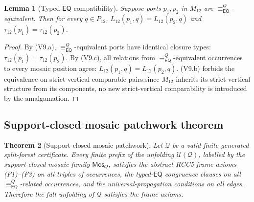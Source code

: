 \documentclass[11pt]{article}
\newtheorem{theorem}{Theorem}[section]
\newtheorem{lemma}[theorem]{Lemma}
\newcommand{\EQ}{\mathsf{EQ}}
\newcommand{\Q}{\mathcal Q}
\newcommand{\U}{\mathcal U}
\newcommand{\Mos}{\mathsf{Mos}}
\newcommand{\eqc}{\equiv_{\EQ}}
\begin{document}
\begin{lemma}[Typed-$\EQ$ compatibility]\label{lem:eq-compat}
Suppose ports $p_1,p_2$ in $M_{12}$ are $\eqc^{Q}$-equivalent.  Then
for every $q\in P_{12}$,
$L_{12}(p_1,q)=L_{12}(p_2,q)$ and
$\tau_{12}(p_1)=\tau_{12}(p_2)$.
\end{lemma}

\begin{proof}
By (V9.a), $\eqc^{Q}$-equivalent ports have identical closure types:\@
$\tau_{12}(p_1)=\tau_{12}(p_2)$.  By (V9.c), all relations from
$\eqc^{Q}$-equivalent occurrences to every mosaic position agree:\@
$L_{12}(p_1,q)=L_{12}(p_2,q)$.  (V9.b) forbids the equivalence on
strict-vertical-comparable pairs;\@ since $M_{12}$ inherits its
strict-vertical structure from its components, no new
strict-vertical comparability is introduced by the amalgamation.
\end{proof}

\subsection{Support-closed mosaic patchwork theorem}
\label{ssec:patchwork}

\begin{theorem}[Support-closed mosaic patchwork]\label{thm:patchwork}
Let $\Q$ be a valid finite generated split-forest certificate.
Every finite prefix of the unfolding $\U(\Q)$, labelled by the
support-closed mosaic family $\Mos_Q$, satisfies the abstract RCC5
frame axioms (F1)--(F3) on all triples of occurrences, the typed-$\EQ$
congruence clauses on all $\eqc^{Q}$-related occurrences, and the
universal-propagation conditions on all edges.  Therefore the full
unfolding of $\Q$ satisfies the frame axioms.
\end{theorem}
\end{document}
